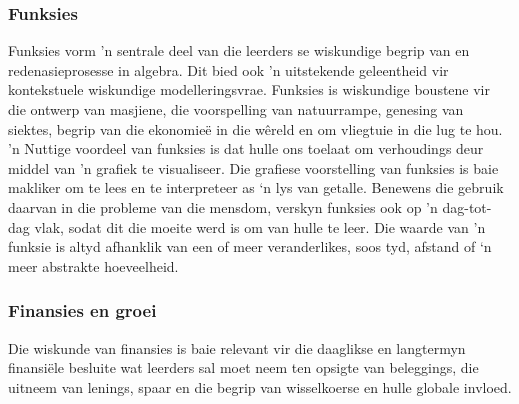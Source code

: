 \subsubsection{Funksies}
Funksies vorm 'n sentrale deel van die leerders se wiskundige begrip van en redenasieprosesse in algebra. Dit bied ook 'n uitstekende geleentheid vir kontekstuele wiskundige modelleringsvrae. Funksies is wiskundige boustene vir die ontwerp van masjiene, die voorspelling van natuurrampe, genesing van siektes, begrip van die ekonomieë in die wêreld en om vliegtuie in die lug te hou. 'n Nuttige voordeel van funksies is dat hulle ons toelaat om verhoudings deur middel van 'n grafiek te visualiseer. Die grafiese voorstelling van funksies is baie makliker om te lees en te interpreteer as ‘n lys van getalle. Benewens die gebruik daarvan in die probleme van die mensdom, verskyn funksies ook op 'n dag-tot-dag vlak, sodat dit die moeite werd is om van hulle te leer. Die waarde van 'n funksie is altyd afhanklik van een of meer veranderlikes, soos tyd, afstand of ‘n meer abstrakte hoeveelheid.

\subsubsection{Finansies en groei}
Die wiskunde van finansies is baie relevant vir die daaglikse en langtermyn finansiële besluite wat leerders sal moet neem ten opsigte van beleggings, die uitneem van lenings, spaar en die begrip van wisselkoerse en hulle globale invloed.

